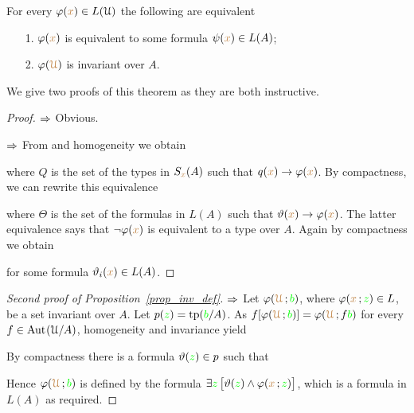 \documentclass[creche.tex]{subfiles}
\begin{document}
\begin{proposition}\label{prop_inv_def}
For every $\varphi({\color{brown} x})\in L(\EuScript U)$ the following are equivalent
\begin{itemize}
 \item[1.] $\varphi({\color{brown} x})$ is equivalent to some formula $\psi({\color{brown} x})\in L(A)$;
 \item[2.] $\varphi({\color{brown}\EuScript U})$ is invariant over $A$.
\end{itemize}
\end{proposition}

We give two proofs of this theorem as they are both instructive. 

\begin{proof}
$\Rightarrow$ Obvious.

$\Rightarrow$ From  and homogeneity we obtain


where $Q$ is the set of the types in $S_{\color{brown} x}(A)$ such that $q({\color{brown} x})\rightarrow\varphi({\color{brown} x})$. 
By compactness, we can rewrite this equivalence 


where $\Theta$ is the set of the formulas in $L(A)$ such that $\vartheta({\color{brown} x})\rightarrow\varphi({\color{brown} x})$.
The latter equivalence says that $\neg\varphi({\color{brown} x})$ is equivalent to a type over $A$. 
Again by compactness we obtain 


for some formula $\vartheta_i({\color{brown} x})\in L(A)$.
\end{proof}

\begin{proof}[Second proof of Proposition~\ref{prop_inv_def}] 
   $\Rightarrow$ 
   Let $\varphi({\color{brown}\EuScript U}\,;{\color{green} b})$, where $\varphi({\color{brown} x}\,;{\color{green} z})\in L$, be a set invariant over $A$.
   Let $p({\color{green} z})={\rm tp}({\color{green} b}/A)$.
   As $f[\varphi({\color{brown}\EuScript U}\,;{\color{green} b})]=\varphi({\color{brown}\EuScript U}\,;f{\color{green} b})$ for every $f\in{\rm Aut\kern.15ex}(\EuScript U/A)$, homogeneity and invariance yield
   

By compactness there is a formula $\vartheta({\color{green} z})\in p$ such that 


Hence  $\varphi({\color{brown}\EuScript U}\,;{\color{green} b})$ is defined by the formula $\exists {\color{green}z}\,\big[\vartheta({\color{green} z})\wedge\varphi({\color{brown} x}\,;{\color{green} z})\big]$, which is a formula in $L(A)$ as required.
\end{proof}
\end{document}
